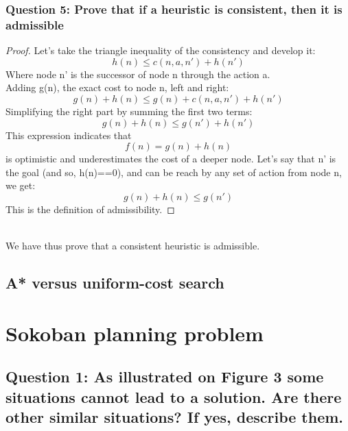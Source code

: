\documentclass[a4paper,10pt]{article}
\begin{document}
			\subsubsection{Question 5: Prove that if a heuristic is consistent, then it is admissible}
				\begin{proof}
					Let's take the triangle inequality of the consistency and develop it:
					$$ h(n) \leq c(n,a,n') + h(n') $$
					Where node n' is the successor of node n through the action a.\\ 
					Adding g(n), the exact cost to node n, left and right:
					$$ g(n) + h(n) \leq g(n) + c(n,a,n') + h(n') $$
					Simplifying the right part by summing the first two terms:
					$$ g(n) + h(n) \leq g(n') + h(n') $$
					This expression indicates that $$ f(n) = g(n) + h(n) $$ is optimistic and underestimates the cost of a deeper node. Let's say that n' is the goal (and so, h(n)==0), and can be reach by any set of action from node n, we get:
					$$ g(n) + h(n) \leq g(n') $$
					This is the definition of admissibility.
				\end{proof}\\
				We have thus prove that a consistent heuristic is admissible.
				
		\subsection{A* versus uniform-cost search}
		
	\section{Sokoban planning problem}
	
		\subsection{Question 1: As illustrated on Figure 3 some situations cannot lead to a solution. Are there other similar situations? If yes, describe them.}
			
\end{document}

